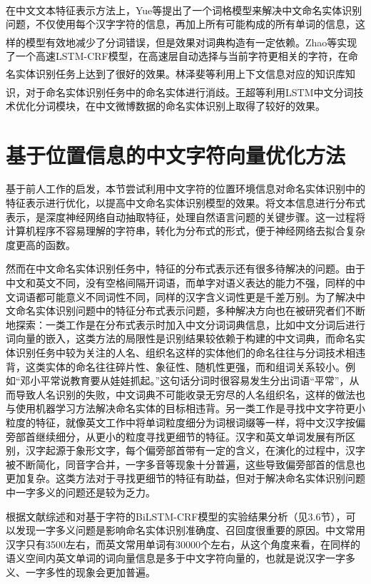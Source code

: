 \documentclass[winfonts,master,oneside,nobackinfo]{njuthesis}
\newcommand{\upcite}[1]{\textsuperscript{\textsuperscript{\cite{#1}}}}
\begin{document}
在中文文本特征表示方法上，Yue等\upcite{Yue}提出了一个词格模型来解决中文命名实体识别问题，不仅使用每个汉字字符的信息，再加上所有可能构成的所有单词的信息，这样的模型有效地减少了分词错误，但是效果对词典构造有一定依赖。Zhao等\upcite{Zhao}实现了一个高速LSTM-CRF模型，在高速层自动选择与当前字符更相关的字符，在命名实体识别任务上达到了很好的效果。林泽斐等\upcite{lzf}利用上下文信息对应的知识库知识，对于命名实体识别任务中的命名实体进行消歧。王超等\upcite{Wang}利用LSTM中文分词技术优化分词模块，在中文微博数据的命名实体识别上取得了较好的效果。

\section{基于位置信息的中文字符向量优化方法}

基于前人工作的启发，本节尝试利用中文字符的位置环境信息对命名实体识别中的特征表示进行优化，以提高中文命名实体识别模型的效果。将文本信息进行分布式表示，是深度神经网络自动抽取特征，处理自然语言问题的关键步骤。这一过程将计算机程序不容易理解的字符串，转化为分布式的形式，便于神经网络去拟合复杂度更高的函数。

然而在中文命名实体识别任务中，特征的分布式表示还有很多待解决的问题。由于中文和英文不同，没有空格间隔开词语，而单字对语义表达的能力不强，同样的中文词语都可能意义不同词性不同，同样的汉字含义词性更是千差万别。为了解决中文命名实体识别问题中的特征分布式表示问题，多种解决方向也在被研究者们不断地探索：一类工作是在分布式表示时加入中文分词词典信息，比如中文分词后进行词向量的嵌入，这类方法的局限性是识别结果较依赖于构建的中文词典，而命名实体识别任务中较为关注的人名、组织名这样的实体他们的命名往往与分词技术相违背，这类实体的命名往往碎片性、象征性、随机性更强，而和组词关系较小。例如“邓小平常说教育要从娃娃抓起。”这句话分词时很容易发生分出词语“平常”，从而导致人名识别的失败，中文词典不可能收录无穷尽的人名组织名，这样的做法也与使用机器学习方法解决命名实体的目标相违背。另一类工作是寻找中文字符更小粒度的特征，就像英文工作中将单词粒度细分为词根词缀等一样，将中文汉字按偏旁部首继续细分，从更小的粒度寻找更细节的特征。汉字和英文单词发展有所区别，汉字起源于象形文字，每个偏旁部首带有一定的含义，在演化的过程中，汉字被不断简化，同音字合并，一字多音等现象十分普遍，这些导致偏旁部首的信息也更加复杂。这类方法对于寻找更细节的特征有助益，但对于解决命名实体识别问题中一字多义的问题还是较为乏力。

根据文献综述和对基于字符的BiLSTM-CRF模型的实验结果分析（见3.6节），可以发现一字多义问题是影响命名实体识别准确度、召回度很重要的原因。中文常用汉字只有3500左右，而英文常用单词有30000个左右，从这个角度来看，在同样的语义空间内英文单词的词向量信息是多于中文字符向量的，也就是说汉字一字多义、一字多性的现象会更加普遍。
\end{document}
